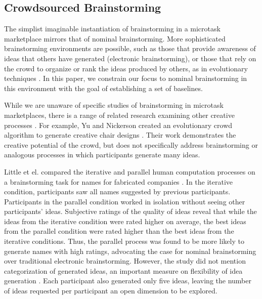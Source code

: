 \subsection{Crowdsourced Brainstorming}
The simplist imaginable instantiation of brainstorming in a microtask marketplace mirrors that of nominal brainstorming. More sophisticated brainstorming environments are possible, such as those that provide awareness of ideas that others have generated (electronic brainstorming), or those that rely on the crowd to organize or rank the ideas produced by others, as in evolutionary techniques \cite{yu_cooks_2011}.
In this paper, we constrain our focus to nominal brainstorming in this environment with the goal of establishing a set of baselines.

While we are unaware of specific studies of brainstorming in microtask marketplaces, there is a range of related research examining other creative processes \cite{lewis2011affective, kittur2011crowdforge, Zhang:2012:HCT:2207676.2207708}. For example, Yu and Nickerson created an evolutionary crowd algorithm to generate creative chair designs \cite{yu_cooks_2011}. Their work demonstrates the creative potential of the crowd, but does not specifically address brainstorming or analogous processes in which participants generate many ideas. 

Little et el. compared the iterative and parallel human computation processes on a brainstorming task for names for fabricated companies \cite{little2010exploring}. In the iterative condition, participants saw all names suggested by previous participants. Participants in the parallel condition worked in isolation without seeing other participants' ideas. Subjective ratings of the quality of ideas reveal that while the ideas from the iterative condition were rated higher on average, the best ideas from the parallel condition were rated higher than the best ideas from the iterative conditions. Thus, the parallel process was found to be more likely to generate names with high ratings, advocating the case for nominal brainstorming over traditional electronic brainstorming. However, the study did not mention categorization of generated ideas, an important measure on flexibility of idea generation \cite{lewis2011affective, nijstad_how_2006, finke1992creative, shah2003metrics}. Each participant also generated only five ideas, leaving the number of ideas requested per participant an open dimension to be explored.


